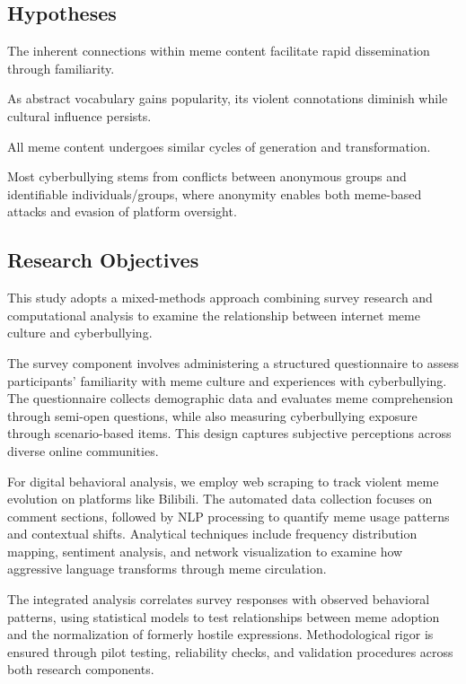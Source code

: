 \documentclass[12pt,a4paper]{ctexart}
\begin{document}
\subsection{Hypotheses}

The inherent connections within meme content facilitate rapid dissemination through familiarity.

As abstract vocabulary gains popularity, its violent connotations diminish while cultural influence persists.

All meme content undergoes similar cycles of generation and transformation.

Most cyberbullying stems from conflicts between anonymous groups and identifiable individuals/groups, where anonymity enables both meme-based attacks and evasion of platform oversight.

\subsection{Research Objectives}

This study adopts a mixed-methods approach combining survey research and computational analysis to examine the relationship between internet meme culture and cyberbullying.

The survey component involves administering a structured questionnaire to assess participants' familiarity with meme culture and experiences with cyberbullying. The questionnaire collects demographic data and evaluates meme comprehension through semi-open questions, while also measuring cyberbullying exposure through scenario-based items. This design captures subjective perceptions across diverse online communities.

For digital behavioral analysis, we employ web scraping to track violent meme evolution on platforms like Bilibili. The automated data collection focuses on comment sections, followed by NLP processing to quantify meme usage patterns and contextual shifts. Analytical techniques include frequency distribution mapping, sentiment analysis, and network visualization to examine how aggressive language transforms through meme circulation.

The integrated analysis correlates survey responses with observed behavioral patterns, using statistical models to test relationships between meme adoption and the normalization of formerly hostile expressions. Methodological rigor is ensured through pilot testing, reliability checks, and validation procedures across both research components.
\end{document}
